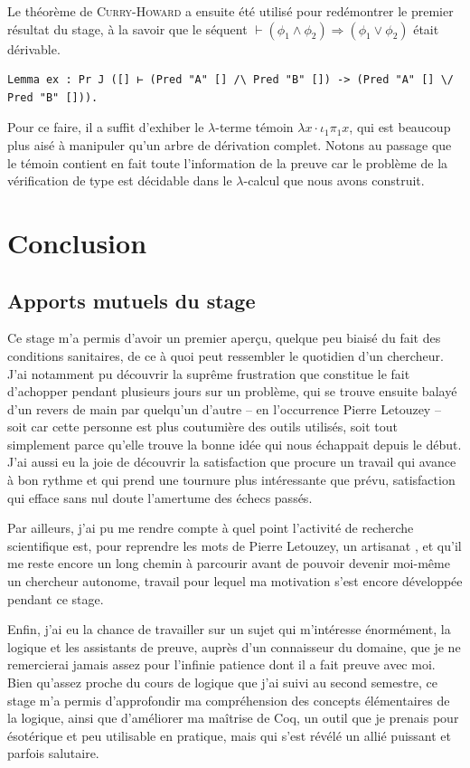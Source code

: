 \documentclass[a4paper]{article}
\begin{document}
Le théorème de \textsc{Curry-Howard} a ensuite été utilisé pour redémontrer le premier résultat du stage, à la savoir que le séquent $\vdash (\phi_1 \wedge \phi_2) \Rightarrow (\phi_1 \vee \phi_2)$ était dérivable.
\begin{verbatim}
Lemma ex : Pr J ([] ⊢ (Pred "A" [] /\ Pred "B" []) -> (Pred "A" [] \/ Pred "B" [])).
\end{verbatim}
Pour ce faire, il a suffit d'exhiber le $\lambda$-terme témoin $\lambda x \cdot \iota_1 \pi_1 x$, qui est beaucoup plus aisé à manipuler qu'un arbre de dérivation complet. Notons au passage que le témoin contient en fait toute l'information de la preuve car le problème de la vérification de type est décidable dans le $\lambda$-calcul que nous avons construit.

\newpage


\section*{Conclusion}

\subsection*{Apports mutuels du stage}

Ce stage m'a permis d'avoir un premier aperçu, quelque peu biaisé du fait des conditions sanitaires, de ce à quoi peut ressembler le quotidien d'un chercheur. J'ai notamment pu découvrir la suprême frustration que constitue le fait d'achopper pendant plusieurs jours sur un problème, qui se trouve ensuite balayé d'un revers de main par quelqu'un d'autre -- en l'occurrence Pierre Letouzey -- soit car cette personne est plus coutumière des outils utilisés, soit tout simplement parce qu'elle trouve la bonne idée qui nous échappait depuis le début. J'ai aussi eu la joie de découvrir la satisfaction que procure un travail qui avance à bon rythme et qui prend une tournure plus intéressante que prévu, satisfaction qui efface sans nul doute l'amertume des échecs passés.

Par ailleurs, j'ai pu me rendre compte à quel point l'activité de recherche scientifique est, pour reprendre les mots de Pierre Letouzey, un \og artisanat \fg{}, et qu'il me reste encore un long chemin à parcourir avant de pouvoir devenir moi-même un chercheur autonome, travail pour lequel ma motivation s'est encore développée pendant ce stage.

Enfin, j'ai eu la chance de travailler sur un sujet qui m'intéresse énormément, la logique et les assistants de preuve, auprès d'un connaisseur du domaine, que je ne remercierai jamais assez pour l'infinie patience dont il a fait preuve avec moi. Bien qu'assez proche du cours de logique que j'ai suivi au second semestre, ce stage m'a permis d'approfondir ma compréhension des concepts élémentaires de la logique, ainsi que d'améliorer ma maîtrise de Coq, un outil que je prenais pour ésotérique et peu utilisable en pratique, mais qui s'est révélé un allié puissant et parfois salutaire.
\medskip
\end{document}
